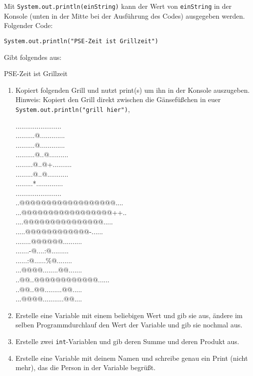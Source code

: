 \documentclass{../../sheet}
\begin{document}
Mit \texttt{System.out.println(einString)} kann der Wert von \texttt{einString} in der Konsole (unten in der Mitte bei der Ausführung des Codes) ausgegeben werden. Folgender Code:
\begin{verbatim}
System.out.println("PSE-Zeit ist Grillzeit")
\end{verbatim}
Gibt folgendes aus:
\begin{ausgabe}
  PSE-Zeit ist Grillzeit
\end{ausgabe}

\begin{enumerate}
    \item Kopiert folgenden Grill und nutzt print(s) um ihn in der Konsole auszugeben.\\
    Hinweis: Kopiert den Grill direkt zwischen die Gänsefüßchen in euer \\\texttt{System.out.println("grill hier")},  
          \begin{ausgabe}
........................\\
..........@.............\\
..........@.............\\
..........@..@..........\\
.........@..@+..........\\
.........@..@...........\\
.........*..............\\
........................\\
..@@@@@@@@@@@@@@@@@@....\\
...@@@@@@@@@@@@@@@@@++..\\
....@@@@@@@@@@@@@@@.....\\
.....@@@@@@@@@@@@-......\\
........@@@@@@..........\\
.......-@....:@.........\\
......:@......\%@........\\
...@@@@........@@.......\\
..@@..@@@@@@@@@@@@......\\
..@@..@@.........@@.....\\
...@@@@...........@@....
          \end{ausgabe}
    \item Erstelle eine Variable mit einem beliebigen Wert und gib sie aus, ändere im selben Programmdurchlauf den Wert der Variable und gib sie nochmal aus.
    \item Erstelle zwei \texttt{int}-Variablen und gib deren Summe und deren Produkt aus.
    \item Erstelle eine Variable mit deinem Namen und schreibe genau ein Print (nicht mehr), das die Person in der Variable begrüßt.
\end{enumerate}
\end{document}
